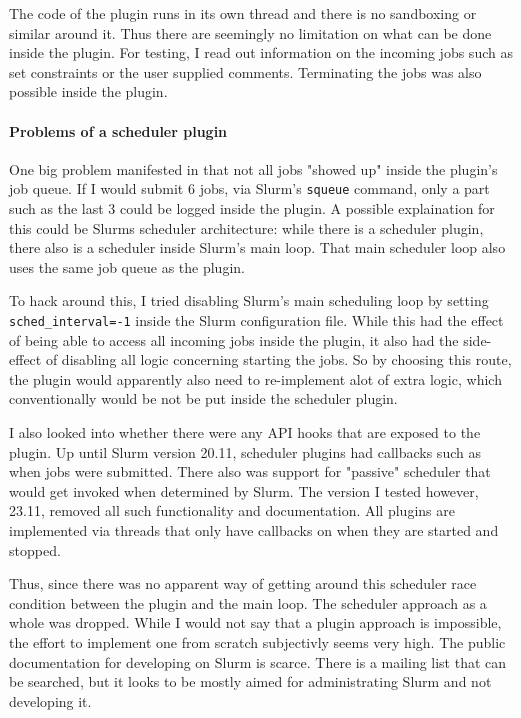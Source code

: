 The code of the plugin runs in its own thread and there is no sandboxing or similar around it.
Thus there are seemingly no limitation on what can be done inside the plugin. 
For testing, I read out information on the incoming jobs such as set constraints or the user supplied comments. Terminating the jobs was also possible inside the plugin.

\paragraph{Problems of a scheduler plugin}

One big problem manifested in that not all jobs "showed up" inside the plugin's job queue. 
If I would submit 6 jobs, via Slurm's \verb|squeue| command, only a part such as the last 3 could be logged inside the plugin.
A possible explaination for this could be Slurms scheduler architecture: while there is a scheduler plugin, there also is a scheduler inside Slurm's main loop. 
That main scheduler loop also uses the same job queue as the plugin.

To hack around this, I tried disabling Slurm's main scheduling loop by setting \verb|sched_interval=-1| inside the Slurm configuration file. 
While this had the effect of being able to access all incoming jobs inside the plugin, it also had the side-effect of disabling all logic concerning starting the jobs.
So by choosing this route, the plugin would apparently also need to re-implement alot of extra logic, which conventionally would be not be put inside the scheduler plugin. 

I also looked into whether there were any API hooks that are exposed to the plugin. 
Up until Slurm version 20.11, scheduler plugins had callbacks such as when jobs were submitted. There also was support for "passive" scheduler that would get invoked when determined by Slurm.
The version I tested however,  23.11, removed all such functionality and documentation. All plugins are implemented via threads that only have callbacks on when they are started and stopped.

Thus, since there was no apparent way of getting around this scheduler race condition between the plugin and the main loop. 
The scheduler approach as a whole was dropped. 
While I would not say that a plugin approach is impossible, the effort to implement one from scratch subjectivly seems very high. 
The public documentation for developing on Slurm is scarce. 
There is a mailing list that can be searched, but it looks to be mostly aimed for administrating Slurm and not developing it.

